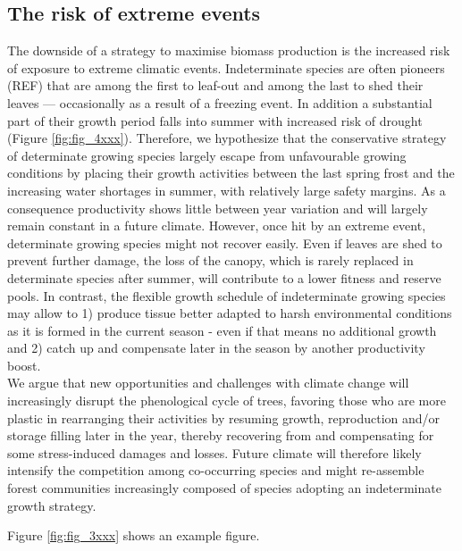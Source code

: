 \documentclass{article}
\begin{document}
			\subsection*{The risk of extreme events}
The downside of a strategy to maximise biomass production is the increased risk of exposure to extreme climatic events. Indeterminate species are often pioneers (REF) that are among the first to leaf-out and among the last to shed their leaves --- occasionally as a result of a freezing event. In addition a substantial part of their growth period falls into summer with increased risk of drought (Figure \ref{fig:fig_4xxx}). Therefore, we hypothesize that the conservative strategy of determinate growing species largely escape from unfavourable growing conditions by placing their growth activities between the last spring frost and the increasing water shortages in summer, with relatively large safety margins. As a consequence productivity shows little between year variation and will largely remain constant in a future climate. However, once hit by an extreme event, determinate growing species might not recover easily. Even if leaves are shed to prevent further damage, the loss of the canopy, which is rarely replaced in determinate species after summer, will contribute to a lower fitness and reserve pools. In contrast, the flexible growth schedule of indeterminate growing species may allow to 1) produce tissue better adapted to harsh environmental conditions as it is formed in the current season - even if that means no additional growth and 2) catch up and compensate later in the season by another productivity boost. \\

We argue that new opportunities and challenges with climate change will increasingly disrupt the phenological cycle of trees, favoring those who are more plastic in rearranging their activities by resuming growth, reproduction and/or storage filling later in the year, thereby recovering from and compensating for some stress-induced damages and losses. Future climate will therefore likely intensify the competition among co-occurring species and might re-assemble forest communities increasingly composed of species adopting an indeterminate growth strategy.

			Figure \ref{fig:fig_3xxx} shows an example figure.
	
\end{document}
